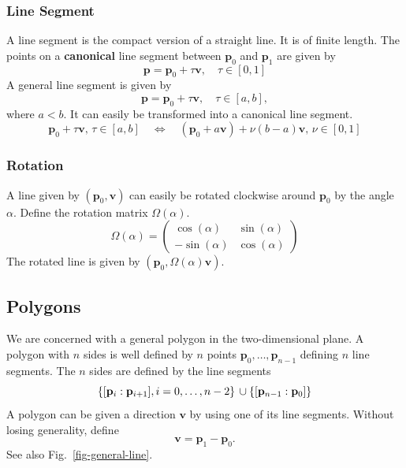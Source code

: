 \documentclass[11pt]{article}
\newcommand{\pb}{\mathbf{p}}
\newcommand{\vb}{\mathbf{v}}
\newcommand{\figref}[1]{Fig.~\eqref{#1}}
\begin{document}
\subsubsection{Line Segment}
\label{sec-line-segment}
A line segment is the compact version of a straight line. It is of finite
length. The points on a {\bf canonical} line segment between $\pb_0$ and 
$\pb_1$ are given by
\begin{equation}
    \pb=\pb_0 + \tau \vb,\quad \tau\in[0,1] \label{eq-line-canonical}
\end{equation}
A general line segment is given by
\begin{equation}
    \pb=\pb_0 + \tau \vb,\quad \tau\in[a,b], \label{eq-line-ab}
\end{equation}
where $a<b$. It can easily be transformed into a canonical line segment.
\begin{equation}
    \pb_0+\tau \vb,\,\tau\in [a,b]\quad\Leftrightarrow\quad
    (\pb_0+a\vb) +\nu(b-a) \vb,\,\nu\in [0,1]
\end{equation}


\subsubsection{Rotation}
\label{sec-rotation-line}

A line given by $(\pb_0, \vb)$ can easily be rotated clockwise around 
$\pb_0$ by the angle $\alpha$. Define the rotation matrix $\Omega(\alpha)$.
\begin{equation}
    \Omega(\alpha)=\left(
    \begin{matrix}
        \cos(\alpha) & \sin(\alpha) \\
        -\sin(\alpha) & \cos(\alpha)
    \end{matrix}
    \right)\label{eq-rotation-matrix-Omega}
\end{equation}
The rotated line is given by $(\pb_0, \Omega(\alpha)\vb)$.

\subsection{Polygons}
\label{sec-polygons}

We are concerned with a general polygon in the two-dimensional plane. A polygon
with $n$ sides is well defined by $n$ points $\pb_0,\ldots,\pb_{n-1}$ 
defining $n$ line segments. The $n$ sides are defined by the line segments
\begin{equation}
    \left\{[\pb_i:\pb_{i+1}], i=0,\ldots,n-2\right\}\\
\cup\left\{[\pb_{n-1}:\pb_{0}]\right\}
\end{equation}
A polygon can be given a direction $\vb$  by using one of its line segments. 
Without losing generality, define 
\begin{equation*}
    \vb=\pb_1-\pb_0.
\end{equation*}
See also \figref{fig-general-line}.
\end{document}
